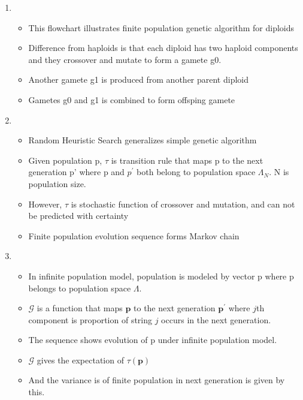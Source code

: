\documentclass{article}
\begin{document}
\begin{enumerate}
\item
  \begin{itemize}
  \item This flowchart illustrates finite population genetic algorithm for diploids
  \item Difference from haploids is that each diploid has two haploid components and they crossover and mutate to form a gamete g0.
  \item Another gamete g1 is produced from another parent diploid 
  \item Gametes g0 and g1 is combined to form offsping gamete  
  \end{itemize}
  
\item
  \begin{itemize}
  \item Random Heuristic Search generalizes simple genetic algorithm
  \item Given population p, $\tau$ is transition rule that maps p to
    the next generation p' where p and $p^\prime$ both belong to population space $\Lambda_N$.
    N is population size. 
    \item However, $\tau$ is stochastic function of crossover and
    mutation, and can not be predicted with
    certainty 
  \item Finite population evolution sequence forms
    Markov chain
  
  \end{itemize}
    
\item
  \begin{itemize}
  \item In infinite population model, population is modeled by vector p where p belongs to population space $\Lambda$.    
  \item $\mathcal{G}$ is a function that maps $\bm{p}$ to the next
    generation $\bm{p}^\prime$ where $j$th component is proportion of string $j$
    occurs in the next generation.
  \item The sequence shows evolution of p under infinite population
    model.
    \item $\mathcal{G}$ gives the expectation of $\tau(\bm{p})$
  \item And the variance is of finite population in next generation is given by this.
  \end{itemize}
    

\end{enumerate}
\end{document}

